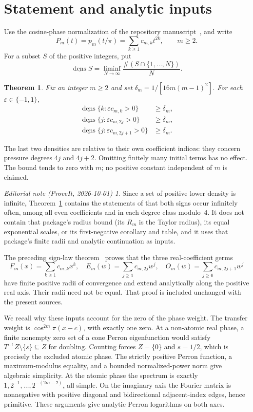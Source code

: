 \documentclass[11pt,a4paper]{article}
\newtheorem{theorem}{Theorem}[section]\newtheorem{lemma}[theorem]{Lemma}
\theoremstyle{remark}\newtheorem*{ednote}{Editorial note (ProveIt, 2026-10-01)}
\newcommand{\ldens}{\underline{\operatorname{dens}}}
\begin{document}
\section{Statement and analytic inputs}
Use the cosine-phase normalization of the repository manuscript~\cite{Repo}, and write
\[
 P_m(t)=p_m(t/\pi)=\sum_{k\ge1}c_{m,k}t^{2k},\qquad m\ge2.
\]
For a subset $S$ of the positive integers, put
\[
 \ldens S=\liminf_{N\to\infty}\frac{\#(S\cap\{1,\ldots,N\})}{N}.
\]
\begin{theorem}\label{thm:main}
Fix an integer $m\ge2$ and set $\delta_m=1/[16m(m-1)^2]$.
For each $\varepsilon\in\{-1,1\}$,
\begin{align*}
 \ldens\{k:\varepsilon c_{m,k}>0\}&\ge\delta_m,\\
 \ldens\{j:\varepsilon c_{m,2j}>0\}&\ge\delta_m,\\
 \ldens\{j:\varepsilon c_{m,2j+1}>0\}&\ge\delta_m.
\end{align*}
\end{theorem}
The last two densities are relative to their own coefficient indices: they concern pressure degrees $4j$ and $4j+2$. Omitting finitely many initial terms has no effect. The bound tends to zero with $m$; no positive constant independent of $m$ is claimed.
\begin{ednote}
Since a set of positive lower density is infinite, Theorem~\ref{thm:main} contains the
statements of  that both signs occur infinitely often, among all
even coefficients and in each degree class modulo~4. It does not contain that package's radius
bound (its $R_m$ is the Taylor radius), its equal exponential scales, or its first-negative
corollary and table, and it uses that package's finite radii and analytic continuation as
inputs.
\end{ednote}

The preceding sign-law theorem~\cite{Signs} proves that the three real-coefficient germs
\begin{equation}\label{eq:three}
 F_m(x)=\sum_{k\ge1}c_{m,k}x^k,\quad
 E_m(w)=\sum_{j\ge1}c_{m,2j}w^j,\quad
 O_m(w)=\sum_{j\ge0}c_{m,2j+1}w^j
\end{equation}
have finite positive radii of convergence and extend analytically along the positive real axis. Their radii need not be equal. That proof is included unchanged with the present sources.

We recall why these inputs account for the zero of the phase weight. The transfer weight is $\cos^{2m}\pi(x-c)$, with exactly one zero. At a non-atomic real phase, a finite nonempty zero set of a cone Perron eigenfunction would satisfy $T^{-1}Z\setminus\{s\}\subseteq Z$ for doubling. Counting forces $Z=\{0\}$ and $s=1/2$, which is precisely the excluded atomic phase. The strictly positive Perron function, a maximum-modulus equality, and a bounded normalized-power norm give algebraic simplicity. At the atomic phase the spectrum is exactly $1,2^{-1},\ldots,2^{-(2m-2)}$, all simple. On the imaginary axis the Fourier matrix is nonnegative with positive diagonal and bidirectional adjacent-index edges, hence primitive. These arguments give analytic Perron logarithms on both axes.
\end{document}
